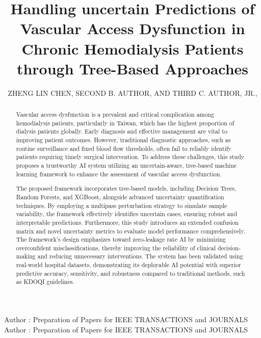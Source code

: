 \documentclass{ieeeaccess}
\begin{document}

\title{Handling uncertain Predictions of Vascular Access Dysfunction in Chronic Hemodialysis Patients through Tree-Based Approaches}
\author{\uppercase{Zheng Lin Chen},
\uppercase{Second B. Author, and Third C. Author,
Jr}.,
}
\address[1]{College of Artificial Intelligence, National Yang Ming Chiao Tung University, Taiwan (email: zhenglin.ai11@nycu.edu.tw)}
\address[2]{Department of Physics, Colorado State University, Fort Collins, 
CO 80523 USA (e-mail: author@lamar.colostate.edu)}
\address[3]{Electrical Engineering Department, University of Colorado, Boulder, CO 
80309 USA}

\markboth
{Author \headeretal: Preparation of Papers for IEEE TRANSACTIONS and JOURNALS}
{Author \headeretal: Preparation of Papers for IEEE TRANSACTIONS and JOURNALS}


\begin{abstract}
Vascular access dysfunction is a prevalent and critical complication among hemodialysis patients, particularly in Taiwan, which has the highest proportion of dialysis patients globally. Early diagnosis and effective management are vital to improving patient outcomes. However, traditional diagnostic approaches, such as routine surveillance and fixed blood flow thresholds, often fail to reliably identify patients requiring timely surgical intervention. To address these challenges, this study proposes a trustworthy AI system utilizing an uncertain-aware, tree-based machine learning framework to enhance the assessment of vascular access dysfunction.

The proposed framework incorporates tree-based models, including Decision Trees, Random Forests, and XGBoost, alongside advanced uncertainty quantification techniques. By employing a multipass perturbation strategy to simulate sample variability, the framework effectively identifies uncertain cases, ensuring robust and interpretable predictions. Furthermore, this study introduces an extended confusion matrix and novel uncertainty metrics to evaluate model performance comprehensively. The framework's design emphasizes toward zero-leakage rate AI by minimizing overconfident misclassifications, thereby improving the reliability of clinical decision-making and reducing unnecessary interventions. The system has been validated using real-world hospital datasets, demonstrating its deployable AI potential with superior predictive accuracy, sensitivity, and robustness compared to traditional methods, such as KDOQI guidelines.
\end{abstract}
\end{document}
